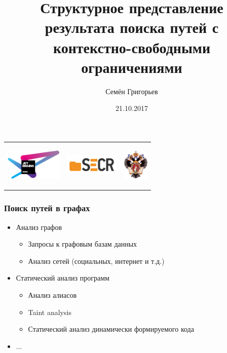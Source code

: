 \documentclass{beamer}
\title[CFPQ]{Структурное представление результата поиска путей с контекстно-свободными ограничениями}
\institute[СПбУ]{
JetBrains Research, лаборатория языковых инструментов \\
Санкт-Петербургский университет
}
\author[Семён Григорьев]{Семён Григорьев}
\date{21.10.2017}
\begin{document}
{
\begin{frame}[fragile]
  \begin{tabular}{p{2.5cm} p{5.5cm} p{2cm}}
   \begin{center}
      \includegraphics[height=1.5cm]{pictures/JBLogo3.pdf}
    \end{center}
    &
    \begin{center}
      \includegraphics[height=1cm]{pictures/logo-2017-transp.png}
    \end{center} 
    &
    \begin{center}
      \includegraphics[height=1.5cm]{pictures/SPbGU_Logo.png}
    \end{center}
  \end{tabular}
  \titlepage
\end{frame}
}


\begin{frame}[fragile]
  \transwipe[direction=90]
  \frametitle{Поиск путей в графах}
  \begin{itemize}
  \item Анализ графов
    \begin{itemize}
        \item Запросы к графовым базам данных
        \item Анализ сетей (социальных, интернет и т.д.)
    \end{itemize}
  \item Статический анализ программ
      \begin{itemize}
        \item Анализ алиасов
        \item Taint analysis
        \item Статический анализ динамически формируемого кода
      \end{itemize}
   \item ...
  \end{itemize}
\end{frame}
\end{document}
